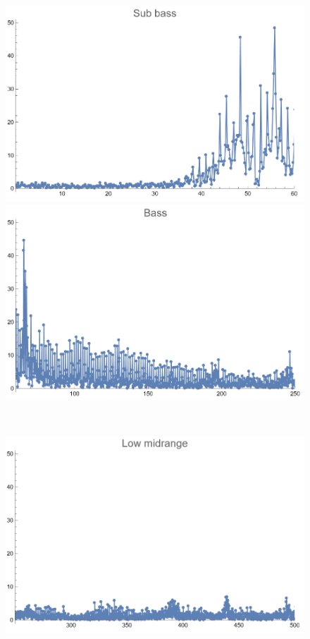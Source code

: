 \documentclass[12pt, letterpaper]{article}
\begin{document}
\begin{figure}[H]
  \centering
  \begin{minipage}{.3\textwidth}
    \centering
    \includegraphics[width=.9\linewidth]{imgs/Cancion5/subbass.png}
  \end{minipage}
  \begin{minipage}{0.03\textwidth}\end{minipage}
  \begin{minipage}{.3\textwidth}
    \centering
    \includegraphics[width=.9\linewidth]{imgs/Cancion5/bass.png}
  \end{minipage} \medskip \\
  \begin{minipage}{.3\textwidth}
    \centering
    \includegraphics[width=.9\linewidth]{imgs/Cancion5/lowmid.png}

\end{minipage}
\end{figure}
\end{document}
